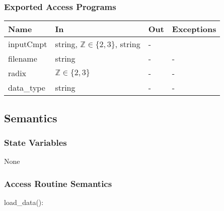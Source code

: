 \documentclass[12pt, titlepage]{article}
\begin{document}
\subsubsection{Exported Access Programs}

\begin{center}
\begin{tabular}{p{2cm} p{4cm} p{4cm} p{2cm}}
\hline
\textbf{Name} & \textbf{In} & \textbf{Out} & \textbf{Exceptions} \\
\hline
inputCmpt & string, $\mathbb{Z}\in\{2, 3\}$, string& - & \\
filename& string & - & -\\
radix&$\mathbb{Z} \in \{2, 3\}$ & - & -\\
data\_type& string& -&-\\

\hline
\end{tabular}
\end{center}

\subsection{Semantics}

\subsubsection{State Variables}
None

\subsubsection{Access Routine Semantics}

load\_data():
\end{document}
